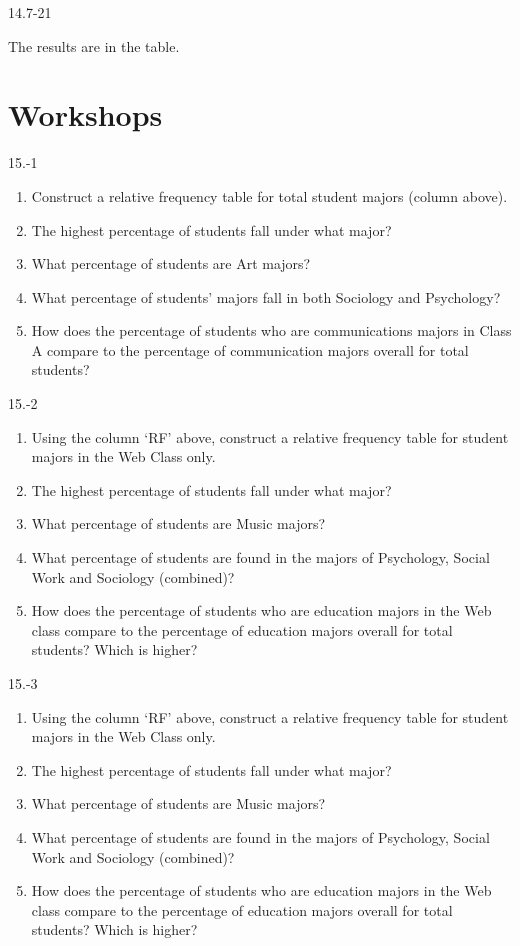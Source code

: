 \begin{exsol@solution}{14.7-21}

  The results are in the table.


\end{exsol@solution}
\setcounter{chapter}{15}\chapter{Workshops}
\begin{exsol@solution}{15.-1}

  \begin{enumerate}
  \item Construct a relative frequency table for total student majors (column above).
  \item	The highest percentage of students fall under what major?
  \item	What percentage of students are Art majors?
  \item	What percentage of students’ majors fall in both Sociology and Psychology?
  \item	How does the percentage of students who are communications majors in Class A compare to the percentage of communication majors overall for total students?
\end{enumerate}
\end{exsol@solution}
\begin{exsol@solution}{15.-2}
  \begin{enumerate}
  \item	Using the column `RF' above, construct a relative frequency table for student majors in the Web Class only.
  \item	The highest percentage of students fall under what major?
  \item	What percentage of students are Music majors?
  \item	What percentage of students are found in the majors of Psychology, Social Work and Sociology (combined)?
  \item	How does the percentage of students who are education majors in the Web class compare to the percentage of education majors overall for total students?  Which is higher?
\end{enumerate}
\end{exsol@solution}
\begin{exsol@solution}{15.-3}
  \begin{enumerate}
  \item	Using the column `RF' above, construct a relative frequency table for student majors in the Web Class only.
  \item	The highest percentage of students fall under what major?
  \item	What percentage of students are Music majors?
  \item	What percentage of students are found in the majors of Psychology, Social Work and Sociology (combined)?
  \item	How does the percentage of students who are education majors in the Web class compare to the percentage of education majors overall for total students?  Which is higher?
\end{enumerate}
\end{exsol@solution}
